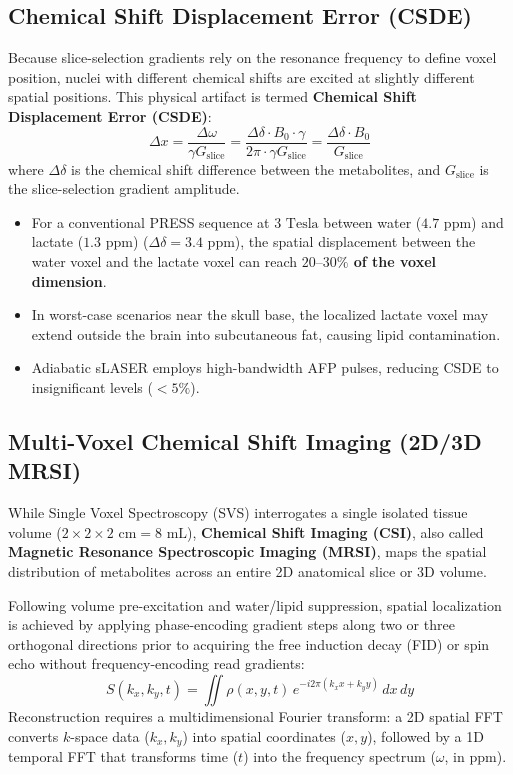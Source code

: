 \documentclass[11pt,a4paper]{article}
\begin{document}
\subsection{Chemical Shift Displacement Error (CSDE)}
Because slice-selection gradients rely on the resonance frequency to define voxel position, nuclei with different chemical shifts are excited at slightly different spatial positions. This physical artifact is termed \textbf{Chemical Shift Displacement Error (CSDE)}:
\begin{equation}
    \Delta x = \frac{\Delta \omega}{\gamma G_{\text{slice}}} = \frac{\Delta \delta \cdot B_0 \cdot \gamma}{2\pi \cdot \gamma G_{\text{slice}}} = \frac{\Delta \delta \cdot B_0}{G_{\text{slice}}}
\end{equation}
where $\Delta \delta$ is the chemical shift difference between the metabolites, and $G_{\text{slice}}$ is the slice-selection gradient amplitude.
\begin{itemize}
    \item For a conventional PRESS sequence at $3\text{ Tesla}$ between water ($4.7\text{ ppm}$) and lactate ($1.3\text{ ppm}$) ($\Delta \delta = 3.4\text{ ppm}$), the spatial displacement between the water voxel and the lactate voxel can reach \textbf{$20\text{--}30\%$ of the voxel dimension}.
    \item In worst-case scenarios near the skull base, the localized lactate voxel may extend outside the brain into subcutaneous fat, causing lipid contamination.
    \item Adiabatic sLASER employs high-bandwidth AFP pulses, reducing CSDE to insignificant levels ($< 5\%$).
\end{itemize}

\subsection{Multi-Voxel Chemical Shift Imaging (2D/3D MRSI)}
While Single Voxel Spectroscopy (SVS) interrogates a single isolated tissue volume ($2 \times 2 \times 2\text{ cm} = 8\text{ mL}$), \textbf{Chemical Shift Imaging (CSI)}, also called \textbf{Magnetic Resonance Spectroscopic Imaging (MRSI)}, maps the spatial distribution of metabolites across an entire 2D anatomical slice or 3D volume.

Following volume pre-excitation and water/lipid suppression, spatial localization is achieved by applying phase-encoding gradient steps along two or three orthogonal directions prior to acquiring the free induction decay (FID) or spin echo without frequency-encoding read gradients:
\begin{equation}
    S(k_x, k_y, t) = \iint \rho(x, y, t) \, e^{-i 2\pi (k_x x + k_y y)} \, dx \, dy
\end{equation}
Reconstruction requires a multidimensional Fourier transform: a 2D spatial FFT converts $k$-space data ($k_x, k_y$) into spatial coordinates ($x, y$), followed by a 1D temporal FFT that transforms time ($t$) into the frequency spectrum ($\omega$, in $\text{ppm}$).
\end{document}

